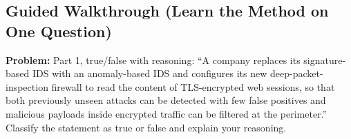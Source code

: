 \documentclass[12pt, a4paper]{article}
\begin{document}
\begin{trapbox}
\begin{itemize}
\end{itemize}
\end{trapbox}

\subsection*{Guided Walkthrough (Learn the Method on One Question)}
\textbf{Problem:} Part 1, true/false with reasoning: ``A company replaces its signature-based IDS with an anomaly-based IDS and configures its new deep-packet-inspection firewall to read the content of TLS-encrypted web sessions, so that both previously unseen attacks can be detected with few false positives and malicious payloads inside encrypted traffic can be filtered at the perimeter.'' Classify the statement as true or false and explain your reasoning.
\end{document}
